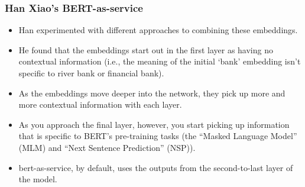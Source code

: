 \begin{frame}[fragile]\frametitle{Han Xiao’s BERT-as-service}

\begin{itemize}
\item Han experimented with different approaches to combining these embeddings.
\item He found that the embeddings start out in the first layer as having no contextual information (i.e., the meaning of the initial `bank' embedding isn't specific to river bank or financial bank).
\item As the embeddings move deeper into the network, they pick up more and more contextual information with each layer.
\item As you approach the final layer, however, you start picking up information that is specific to BERT’s pre-training tasks (the ``Masked Language Model'' (MLM) and ``Next Sentence Prediction'' (NSP)).
\item bert-as-service, by default, uses the outputs from the second-to-last layer of the model.
\end{itemize}

\end{frame}
